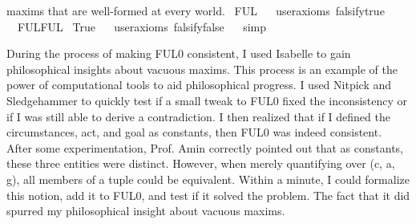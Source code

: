 \begin{isabellebody}
{maxims that are well-formed at every world.%
}\isanewline
\isanewline
{}\isamarkupfalse%
\ {\isachardoublequoteopen}FUL{\isachardoublequoteclose}\isanewline
\ \ \isamarkupfalse%
{\isacharbrackleft}user{\isacharunderscore}axioms{\isacharcomma}\ falsify{\isacharequal}true{\isacharbrackright}%
\isadelimproof
\ %
\endisadelimproof
%
\isatagproof
{}\isamarkupfalse%
\isanewline
%
%
\endisatagproof
{\isafoldproof}%
%
\isadelimproof
%
\endisadelimproof
\isanewline
\isanewline
{}\isamarkupfalse%
\ \ FUL{\isacharcolon}FUL\isanewline
\isanewline
{}\isamarkupfalse%
\ True\isanewline
\ \ \isamarkupfalse%
{\isacharbrackleft}user{\isacharunderscore}axioms{\isacharcomma}\ falsify{\isacharequal}false{\isacharbrackright}%
\isadelimproof
\ %
\endisadelimproof
%
\isatagproof
{}\isamarkupfalse%
\ simp\isanewline
%
%
\endisatagproof
{\isafoldproof}%
%
\isadelimproof
%
\endisadelimproof
%
\begin{isamarkuptext}%
During the process of making FUL0 consistent, I used Isabelle to gain philosophical insights 
about vacuous maxims. This process is an example of the power of computational tools to aid
philosophical progress. I used Nitpick and Sledgehammer to quickly test if a small tweak 
to FUL0 fixed the inconsistency or if I was still able to derive a contradiction.  I then realized that if 
I defined the circumstances, act, and goal as constants, then FUL0 was indeed consistent. After some 
experimentation, Prof. Amin correctly pointed out that as constants, these three entities were 
distinct. However, when merely quantifying over (c, a, g), all members of a tuple could be equivalent. Within
a minute, I could formalize this notion, add it to FUL0, and test if it solved the problem. The fact 
that it did spurred my philosophical insight about vacuous maxims. 


\end{isamarkuptext}
\end{isabellebody}
